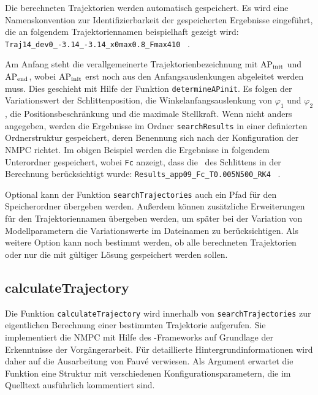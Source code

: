 Die berechneten Trajektorien werden automatisch gespeichert. Es wird eine Namenskonvention zur Identifizierbarkeit der gespeicherten Ergebnisse eingeführt, die an folgendem Trajektoriennamen beispielhaft gezeigt wird: \texttt{Traj14\_dev0\_-3.14\_-3.14\_x0max0.8\_Fmax410} \ .

Am Anfang steht die verallgemeinerte Trajektorienbezeichnung mit $\mathrm{AP_{init}}$ und $\mathrm{AP_{end}}$, wobei $\mathrm{AP_{init}}$ erst noch aus den Anfangsauslenkungen abgeleitet werden muss. Dies geschieht mit Hilfe der Funktion \texttt{determineAPinit}. Es folgen der Variationswert der Schlittenposition, die Winkelanfangsauslenkung von $\varphi_1$ und $\varphi_2$, die Positionsbeschränkung und die maximale Stellkraft. 
Wenn nicht anders angegeben, werden die Ergebnisse im Ordner \texttt{searchResults} in einer definierten Ordnerstruktur gespeichert, deren Benennung sich nach der Konfiguration der NMPC richtet. Im obigen Beispiel werden die Ergebnisse in folgendem Unterordner gespeichert, wobei \texttt{Fc} anzeigt, dass die \crb\ des Schlittens in der Berechnung berücksichtigt wurde: \texttt{Results\_app09\_Fc\_T0.005N500\_RK4} \ .

Optional kann der Funktion \texttt{searchTrajectories} auch ein Pfad für den Speicherordner übergeben werden. Außerdem können zusätzliche Erweiterungen für den Trajektoriennamen übergeben werden, um später bei der Variation von Modellparametern die Variationswerte im Dateinamen zu berücksichtigen. 
Als weitere Option kann noch bestimmt werden, ob alle berechneten Trajektorien oder nur die mit gültiger Lösung gespeichert werden sollen. 


\subsection{calculateTrajectory}\label{subsec:calctrj}

Die Funktion \texttt{calculateTrajectory} wird innerhalb von \texttt{searchTrajectories} zur eigentlichen Berechnung einer bestimmten Trajektorie aufgerufen. Sie implementiert die NMPC mit Hilfe des \casadi-Frameworks auf Grundlage der Erkenntnisse der Vorgängerarbeit. Für detaillierte Hintergrundinformationen wird daher auf die Ausarbeitung von Fauvé \cite{fauve} verwiesen. Als Argument erwartet die Funktion eine Struktur mit verschiedenen Konfigurationsparametern, die im Quelltext ausführlich kommentiert sind.


